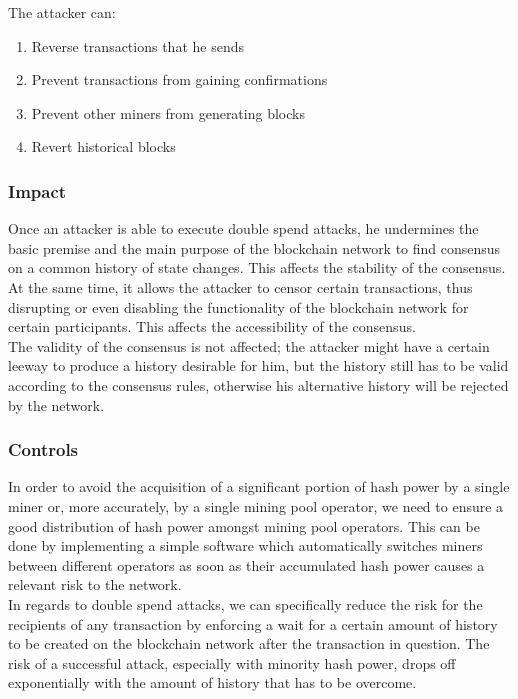 \documentclass[11pt,a4paper,draft]{article}
\begin{document}
The attacker can:
\begin{enumerate}
  \item Reverse transactions that he sends
  \item Prevent transactions from gaining confirmations
  \item Prevent other miners from generating blocks
  \item Revert historical blocks
\end{enumerate}

\subsubsection{Impact}

Once an attacker is able to execute double spend attacks, he undermines the basic premise and the main purpose of the blockchain network to find consensus on a common history of state changes. This affects the stability of the consensus.\\

At the same time, it allows the attacker to censor certain transactions, thus disrupting or even disabling the functionality of the blockchain network for certain participants. This affects the accessibility of the consensus.\\

The validity of the consensus is not affected; the attacker might have a certain leeway to produce a history desirable for him, but the history still has to be valid according to the consensus rules, otherwise his alternative history will be rejected by the network.\\

\subsubsection{Controls}

In order to avoid the acquisition of a significant portion of hash power by a single miner or, more accurately, by a single mining pool operator, we need to ensure a good distribution of hash power amongst mining pool operators. This can be done by implementing a simple software which automatically switches miners between different operators as soon as their accumulated hash power causes a relevant risk to the network.\\

In regards to double spend attacks, we can specifically reduce the risk for the recipients of any transaction by enforcing a wait for a certain amount of history to be created on the blockchain network after the transaction in question. The risk of a successful attack, especially with minority hash power, drops off exponentially with the amount of history that has to be overcome.\\
\end{document}
